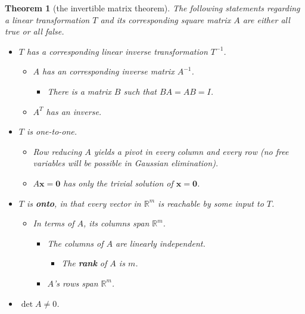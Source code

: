 \documentclass[draft,12pt]{report}
\newtheorem{theorem}{Theorem}
\renewcommand{\vec}[1]{\mathbf{#1}}
\begin{document}
\begin{theorem}[the invertible matrix theorem]
    The following statements regarding a linear transformation $T$ and its corresponding square matrix $A$ are either all true or all false.
    \begin{itemize}
        \item $T$ has a corresponding linear inverse transformation $T^{-1}$.
        \begin{itemize}
            \item $A$ has an corresponding inverse matrix $A^{-1}$.
            \begin{itemize}
                \item There is a matrix $B$ such that $BA = AB = I$.
            \end{itemize}
            \item $A^T$ has an inverse.
        \end{itemize}
        \item $T$ is one-to-one.
        \begin{itemize}
            \item Row reducing $A$ yields a pivot in every column and every row (no free variables will be possible in Gaussian elimination).
            \item $A\vec{x} = \vec{0}$ has only the trivial solution of $\vec{x} = \vec{0}$.
        \end{itemize}
        \item $T$ is \textbf{onto}, in that every vector in $\mathbb R^m$ is reachable by some input to $T$.
        \begin{itemize}
            \item In terms of $A$, its columns span $\mathbb R^m$.
            \begin{itemize}
                \item The columns of $A$ are linearly independent.
                \begin{itemize}
                    \item The \textbf{rank} of $A$ is $m$.
                \end{itemize}
                \item $A$'s rows span $\mathbb R^m$.
            \end{itemize}
        \end{itemize}
        \item $\det A \neq 0$.
    \end{itemize}
\end{theorem}
\end{document}
